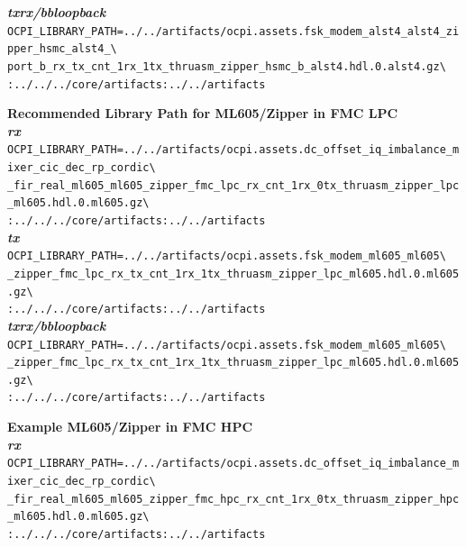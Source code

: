 \begin{appendices}
\noindent\textbf{\textit{txrx/bbloopback}}\\
\verb|OCPI_LIBRARY_PATH=../../artifacts/ocpi.assets.fsk_modem_alst4_alst4_zipper_hsmc_alst4_\| \\
\verb|port_b_rx_tx_cnt_1rx_1tx_thruasm_zipper_hsmc_b_alst4.hdl.0.alst4.gz\| \\
\verb|:../../../core/artifacts:../../artifacts| \\
\par\medskip


\noindent\textbf{Recommended Library Path for ML605/Zipper in FMC LPC}\\

\noindent\textbf{\textit{rx}}\\
\verb|OCPI_LIBRARY_PATH=../../artifacts/ocpi.assets.dc_offset_iq_imbalance_mixer_cic_dec_rp_cordic\| \\
\verb|_fir_real_ml605_ml605_zipper_fmc_lpc_rx_cnt_1rx_0tx_thruasm_zipper_lpc_ml605.hdl.0.ml605.gz\| \\
\verb|:../../../core/artifacts:../../artifacts| \\

\noindent\textbf{\textit{tx}}\\
\verb|OCPI_LIBRARY_PATH=../../artifacts/ocpi.assets.fsk_modem_ml605_ml605\| \\
\verb|_zipper_fmc_lpc_rx_tx_cnt_1rx_1tx_thruasm_zipper_lpc_ml605.hdl.0.ml605.gz\| \\
\verb|:../../../core/artifacts:../../artifacts| \\

\noindent\textbf{\textit{txrx/bbloopback}}\\
\verb|OCPI_LIBRARY_PATH=../../artifacts/ocpi.assets.fsk_modem_ml605_ml605\| \\
\verb|_zipper_fmc_lpc_rx_tx_cnt_1rx_1tx_thruasm_zipper_lpc_ml605.hdl.0.ml605.gz\| \\
\verb|:../../../core/artifacts:../../artifacts| \\
\par\medskip

\noindent\textbf{Example ML605/Zipper in FMC HPC}\\
\noindent\textbf{\textit{rx}}\\
\verb|OCPI_LIBRARY_PATH=../../artifacts/ocpi.assets.dc_offset_iq_imbalance_mixer_cic_dec_rp_cordic\| \\
\verb|_fir_real_ml605_ml605_zipper_fmc_hpc_rx_cnt_1rx_0tx_thruasm_zipper_hpc_ml605.hdl.0.ml605.gz\| \\
\verb|:../../../core/artifacts:../../artifacts| \\


\end{appendices}
